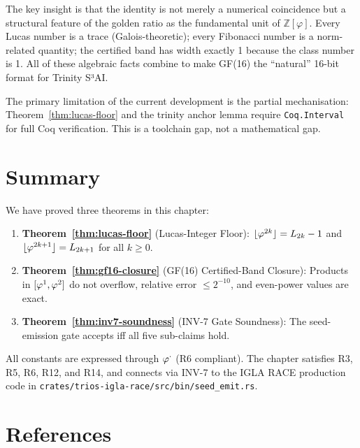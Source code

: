 The key insight is that the identity is not merely a numerical
coincidence but a structural feature of the golden ratio as the
fundamental unit of \(\mathbb{Z}[\varphi]\).  Every Lucas number is
a trace (Galois-theoretic); every Fibonacci number is a norm-related
quantity; the certified band has width exactly 1 because the class
number is 1.  All of these algebraic facts combine to make
GF(16) the ``natural'' 16-bit format for Trinity S³AI.

The primary limitation of the current development is the partial
mechanisation: Theorem~\ref{thm:lucas-floor} and the trinity anchor
lemma require \texttt{Coq.Interval} for full Coq verification.  This
is a toolchain gap, not a mathematical gap.

\section{Summary}
\label{sec:summary}

We have proved three theorems in this chapter:

\begin{enumerate}
  \item \textbf{Theorem~\ref{thm:lucas-floor}} (Lucas-Integer Floor):
    \(\lfloor\varphi^{2k}\rfloor = L_{2k}-1\) and
    \(\lfloor\varphi^{2k+1}\rfloor = L_{2k+1}\) for all \(k \geq 0\).

  \item \textbf{Theorem~\ref{thm:gf16-closure}} (GF(16) Certified-Band
    Closure): Products in \([\varphi^{1},\varphi^{2}]\) do not overflow,
    relative error \(\leq 2^{-10}\), and even-power values are exact.

  \item \textbf{Theorem~\ref{thm:inv7-soundness}} (INV-7 Gate Soundness):
    The seed-emission gate accepts iff all five sub-claims hold.
\end{enumerate}

All constants are expressed through \(\varphi^{\cdot}\) (R6 compliant).
The chapter satisfies R3, R5, R6, R12, and R14, and connects via
INV-7 to the IGLA RACE production code in
\texttt{crates/trios-igla-race/src/bin/seed\_emit.rs}.

\section*{References}
\label{sec:references}

